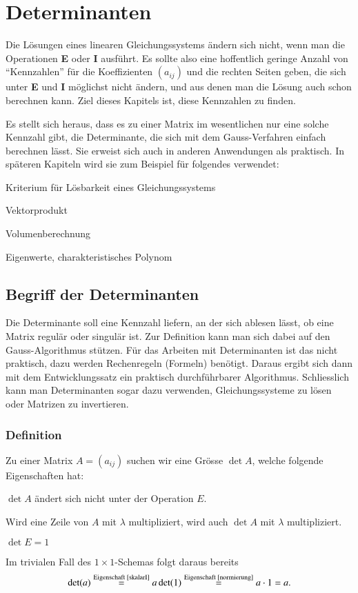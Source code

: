 \chapter{Determinanten\label{chapter-determinanten}}
Die Lösungen eines linearen Gleichungssystems ändern sich nicht,
wenn man die Operationen {\bf E} oder {\bf I} ausführt.
Es sollte
also eine hoffentlich geringe Anzahl von ``Kennzahlen'' für die
Koeffizienten $(a_{ij})$
und die rechten Seiten geben, die sich unter {\bf E} und {\bf I}
möglichst nicht ändern, und aus denen man die Lösung auch
schon berechnen kann.
Ziel dieses Kapitels ist, diese Kennzahlen zu finden.

Es stellt sich heraus, dass es zu einer Matrix
im wesentlichen nur eine solche Kennzahl gibt, die Determinante,
die sich mit dem Gauss-Verfahren einfach berechnen lässt.
Sie erweist sich auch in anderen Anwendungen als praktisch.
In späteren Kapiteln
wird sie zum Beispiel für folgendes verwendet:
\begin{compactitem}
\item Kriterium für Lösbarkeit eines Gleichungssystems
\item Vektorprodukt
\item Volumenberechnung
\item Eigenwerte, charakteristisches Polynom
\end{compactitem}
\section{Begriff der Determinanten}
Die Determinante soll eine Kennzahl liefern, an der sich ablesen
lässt, ob eine Matrix regulär oder singulär ist.
Zur Definition kann man sich dabei auf den Gauss-Algorithmus stützen.
Für das
Arbeiten mit Determinanten ist das nicht praktisch, dazu werden
Rechenregeln (Formeln) benötigt.
Daraus ergibt sich dann mit
dem Entwicklungssatz ein praktisch durchführbarer Algorithmus.
Schliesslich kann man Determinanten sogar dazu verwenden, Gleichungssysteme
zu lösen oder Matrizen zu invertieren.
\subsection{Definition}
Zu einer Matrix $A=(a_{ij})$ suchen wir eine Grösse
$\det A$, welche folgende Eigenschaften hat:
\begin{compactenum}
\item $\det A$ ändert sich nicht unter der Operation $E$.\label{invarianzE}
\item Wird eine Zeile von $A$ mit $\lambda$ multipliziert,\label{skalarI}
wird auch $\det A$ mit $\lambda$ multipliziert.
\item $\det E=1$\label{normierung}
\end{compactenum}
Im trivialen Fall des $1\times1$-Schemas folgt daraus bereits
\[
\det(a)\overset{\text{Eigenschaft \ref{skalarI}}}=a\det(1)\overset{\text{Eigenschaft \ref{normierung}}}=a\cdot 1=a.
\]

